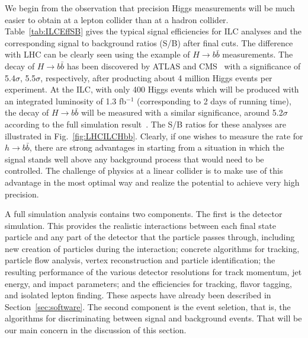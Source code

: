 We begin from the observation that 
precision Higgs measurements will be much easier to obtain 
at a lepton collider than  at a hadron collider.
Table~\ref{tab:ILCEffSB} gives the typical signal efficiencies for ILC
analyses and the corresponding signal to
background ratios (S/B) after final cuts. The difference with
LHC can be clearly seen using the example of $H\to b\bar{b}$ measurements.
The decay of $H\to b\bar{b}$
has been discovered by ATLAS and
CMS~\cite{Aaboud:2018zhk,Sirunyan:2018kst} 
with a significance of 5.4$\sigma$, 5.5$\sigma$, respectively, 
after producting  about  4 million Higgs events per experiment.  At
the ILC,  with only 400 Higgs events which will be produced with an
 integrated luminosity of 1.3 fb$^{-1}$ (corresponding to 2 days of
 running time),
the decay of $H\to b\bar{b}$ will be 
measured with a similar significance, around 5.2$\sigma$ according to the full 
simulation result~\cite{Ogawa:2018}.  The S/B ratios for these
analyses are illustrated in  Fig.~\ref{fig:LHCILCHbb}. Clearly, if one
wishes to measure the rate for $h\to b\bar b$,
there are strong advantages in starting from a situation in which the
signal stands well above any background process that would need to be
controlled.   The challenge of physics at a linear collider is to make use of this
advantage in the most optimal way and realize the potential to achieve 
very high precision.


A full simulation analysis contains two components.  The first is the 
detector simulation.  This provides  the 
realistic interactions between each final state particle and 
any part of the detector that the particle passes through, including new creation of
particles during the interaction; concrete algorithms for tracking,
particle flow analysis, vertex reconstruction and particle identification; 
the resulting performance of the various detector resolutions for track momentum, jet energy,
and impact parameters; and the  efficiencies for tracking, flavor tagging, 
and isolated lepton finding.  These aspects have already been
described in Section~\ref{sec:software}. The second component
 is the event seletion, that is, the algorithms
for discriminating
between signal and background events. That will be our main concern in
the discussion of this section.

